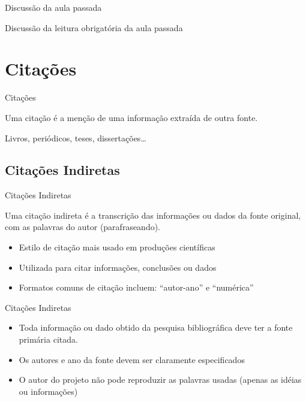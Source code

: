 \documentclass{beamer}
\begin{document}

\begin{frame}{Discussão da aula passada}
  \begin{block}{}
    Discussão da leitura obrigatória da aula passada
  \end{block}
\end{frame}

\section{Citações}

\begin{frame}{Citações}
  \begin{definition}
    Uma citação é a menção de uma informação extraída de outra fonte.
  \end{definition}
  \begin{example}
    Livros, periódicos, teses, dissertações\ldots
  \end{example}
\end{frame}

\subsection{Citações Indiretas}

\begin{frame}{Citações Indiretas}
  \begin{definition}
    Uma citação indireta é a transcrição das informações ou dados da
    fonte original, com as palavras do autor (parafraseando).
  \end{definition}
  \begin{itemize}
  \item Estilo de citação mais usado em produções científicas
  \item Utilizada para citar informações, conclusões ou dados
  \item Formatos comuns de citação incluem: ``autor-ano'' e
    ``numérica''
  \end{itemize}
\end{frame}

\begin{frame}{Citações Indiretas}
  \begin{itemize}
  \item \alert{Toda} informação ou dado obtido da pesquisa
    bibliográfica \alert{deve} ter a fonte primária citada.
  \item Os autores e ano da fonte devem ser claramente especificados
  \item O autor do projeto \alert{não pode} reproduzir as palavras
    usadas (apenas as idéias ou informações)
  \end{itemize}
\end{frame}
\end{document}
